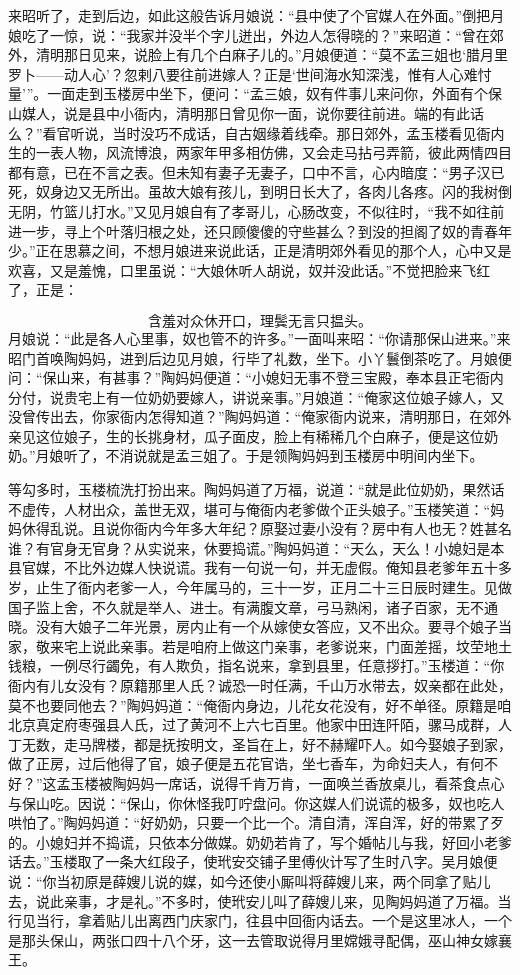 来昭听了，走到后边，如此这般告诉月娘说：“县中使了个官媒人在外面。”倒把月娘吃了一惊，说：“我家并没半个字儿迸出，外边人怎得晓的？”来昭道：“曾在郊外，清明那日见来，说脸上有几个白麻子儿的。”月娘便道：“莫不孟三姐也‘腊月里罗卜——动人心’？忽剌八要往前进嫁人？正是‘世间海水知深浅，惟有人心难忖量’”。一面走到玉楼房中坐下，便问：“孟三娘，奴有件事儿来问你，外面有个保山媒人，说是县中小衙内，清明那日曾见你一面，说你要往前进。端的有此话么？”看官听说，当时没巧不成话，自古姻缘着线牵。那日郊外，孟玉楼看见衙内生的一表人物，风流博浪，两家年甲多相仿佛，又会走马拈弓弄箭，彼此两情四目都有意，已在不言之表。但未知有妻子无妻子，口中不言，心内暗度：“男子汉已死，奴身边又无所出。虽故大娘有孩儿，到明日长大了，各肉儿各疼。闪的我树倒无阴，竹篮儿打水。”又见月娘自有了孝哥儿，心肠改变，不似往时，“我不如往前进一步，寻上个叶落归根之处，还只顾傻傻的守些甚么？到没的担阁了奴的青春年少。”正在思慕之间，不想月娘进来说此话，正是清明郊外看见的那个人，心中又是欢喜，又是羞愧，口里虽说：“大娘休听人胡说，奴并没此话。”不觉把脸来飞红了，正是：

\[
含羞对众休开口，理鬓无言只揾头。
\]
月娘说：“此是各人心里事，奴也管不的许多。”一面叫来昭：“你请那保山进来。”来昭门首唤陶妈妈，进到后边见月娘，行毕了礼数，坐下。小丫鬟倒茶吃了。月娘便问：“保山来，有甚事？”陶妈妈便道：“小媳妇无事不登三宝殿，奉本县正宅衙内分付，说贵宅上有一位奶奶要嫁人，讲说亲事。”月娘道：“俺家这位娘子嫁人，又没曾传出去，你家衙内怎得知道？”陶妈妈道：“俺家衙内说来，清明那日，在郊外亲见这位娘子，生的长挑身材，瓜子面皮，脸上有稀稀几个白麻子，便是这位奶奶。”月娘听了，不消说就是孟三姐了。于是领陶妈妈到玉楼房中明间内坐下。

等勾多时，玉楼梳洗打扮出来。陶妈妈道了万福，说道：“就是此位奶奶，果然话不虚传，人材出众，盖世无双，堪可与俺衙内老爹做个正头娘子。”玉楼笑道：“妈妈休得乱说。且说你衙内今年多大年纪？原娶过妻小没有？房中有人也无？姓甚名谁？有官身无官身？从实说来，休要捣谎。”陶妈妈道：“天么，天么！小媳妇是本县官媒，不比外边媒人快说谎。我有一句说一句，并无虚假。俺知县老爹年五十多岁，止生了衙内老爹一人，今年属马的，三十一岁，正月二十三日辰时建生。见做国子监上舍，不久就是举人、进士。有满腹文章，弓马熟闲，诸子百家，无不通晓。没有大娘子二年光景，房内止有一个从嫁使女答应，又不出众。要寻个娘子当家，敬来宅上说此亲事。若是咱府上做这门亲事，老爹说来，门面差摇，坟茔地土钱粮，一例尽行蠲免，有人欺负，指名说来，拿到县里，任意拶打。”玉楼道：“你衙内有儿女没有？原籍那里人氏？诚恐一时任满，千山万水带去，奴亲都在此处，莫不也要同他去？”陶妈妈道：“俺衙内身边，儿花女花没有，好不单径。原籍是咱北京真定府枣强县人氏，过了黄河不上六七百里。他家中田连阡陌，骡马成群，人丁无数，走马牌楼，都是抚按明文，圣旨在上，好不赫耀吓人。如今娶娘子到家，做了正房，过后他得了官，娘子便是五花官诰，坐七香车，为命妇夫人，有何不好？”这孟玉楼被陶妈妈一席话，说得千肯万肯，一面唤兰香放桌儿，看茶食点心与保山吃。因说：“保山，你休怪我叮咛盘问。你这媒人们说谎的极多，奴也吃人哄怕了。”陶妈妈道：“好奶奶，只要一个比一个。清自清，浑自浑，好的带累了歹的。小媳妇并不捣谎，只依本分做媒。奶奶若肯了，写个婚帖儿与我，好回小老爹话去。”玉楼取了一条大红段子，使玳安交铺子里傅伙计写了生时八字。吴月娘便说：“你当初原是薛嫂儿说的媒，如今还使小厮叫将薛嫂儿来，两个同拿了贴儿去，说此亲事，才是礼。”不多时，使玳安儿叫了薛嫂儿来，见陶妈妈道了万福。当行见当行，拿着贴儿出离西门庆家门，往县中回衙内话去。一个是这里冰人，一个是那头保山，两张口四十八个牙，这一去管取说得月里嫦娥寻配偶，巫山神女嫁襄王。

